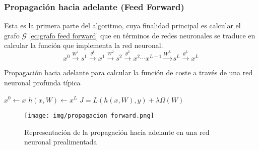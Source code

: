 	
    \subsubsection{Propagación hacia adelante (Feed Forward)}
        
        Esta es la primera parte del algoritmo, cuya finalidad principal es calcular el grafo $\mathcal{G}$ \eqref{eq:grafo feed forward} que en términos de redes neuronales se traduce en calcular la función que implementa la red neuronal. \\
        
        \begin{equation} \label{eq:grafo feed forward}
            x^0 \overset{W^1}{\longrightarrow} s^1 \overset{\theta^1}{\longrightarrow} x^1 \overset{W^2}{\longrightarrow} s^2 \overset{\theta^2}{\longrightarrow} x^2 \cdots x^{L-1} \overset{W^L}{\longrightarrow} s^L \overset{\theta^L}{\longrightarrow}x^L
        \end{equation}
        
        	\begin{algorithm}[H]
        	\label{alg:forward}
	        \caption{Propagación hacia adelante para calcular la función de coste a través de una red neuronal profunda típica}
	        
	        $x^0 \leftarrow x$ \; 
	       $h(x,W) \leftarrow x^L$\;
	       $J = L(h(x,W),y) + \lambda \Omega(W)$
	       \end{algorithm}
	       
	                       
	       
	       
	       \begin{figure}[H]
	           \centering
	           \texttt{[image: img/propagacion forward.png]}
	           \caption{Representación de la propagación hacia adelante en una red neuronal prealimentada}
	           \label{fig:esquema forward}
	       \end{figure}
        
